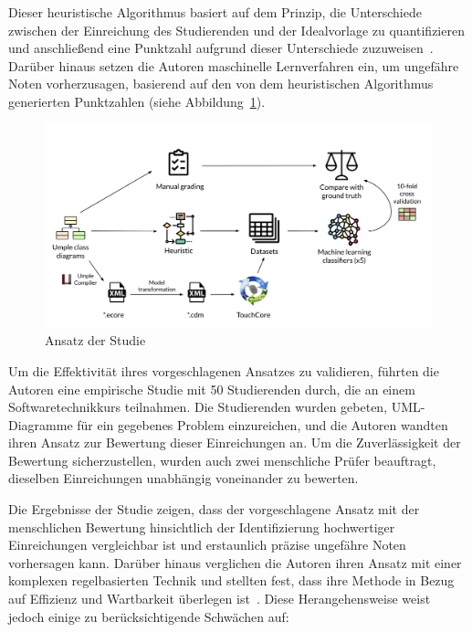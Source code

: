 Dieser heuristische Algorithmus basiert auf dem Prinzip, die Unterschiede zwischen der Einreichung des Studierenden und der
Idealvorlage zu quantifizieren und anschließend eine Punktzahl aufgrund dieser Unterschiede zuzuweisen~\cite{huyck1993efficient}.
Darüber hinaus setzen die Autoren maschinelle Lernverfahren ein, um ungefähre Noten vorherzusagen, basierend auf den von
dem heuristischen Algorithmus generierten Punktzahlen (siehe Abbildung~\ref{fig:ml-approach}).

\begin{figure}
	\centering
	\includegraphics[width=14cm]{images/ml-approach}
	\caption{Ansatz der Studie \cite{boubekeur2020automatic}}
	\label{fig:ml-approach}
\end{figure}

Um die Effektivität ihres vorgeschlagenen Ansatzes zu validieren, führten die Autoren eine empirische Studie mit 50
Studierenden durch, die an einem Softwaretechnikkurs teilnahmen. Die Studierenden wurden gebeten, UML-Diagramme für ein
gegebenes Problem einzureichen, und die Autoren wandten ihren Ansatz zur Bewertung dieser Einreichungen an.
Um die Zuverlässigkeit der Bewertung sicherzustellen, wurden auch zwei menschliche Prüfer beauftragt, dieselben
Einreichungen unabhängig voneinander zu bewerten.

Die Ergebnisse der Studie zeigen, dass der vorgeschlagene Ansatz mit der menschlichen Bewertung hinsichtlich der
Identifizierung hochwertiger Einreichungen vergleichbar ist und erstaunlich präzise ungefähre Noten vorhersagen kann.
Darüber hinaus verglichen die Autoren ihren Ansatz mit einer komplexen regelbasierten Technik und stellten fest, dass
ihre Methode in Bezug auf Effizienz und Wartbarkeit überlegen ist~\cite{boubekeur2020automatic}. Diese Herangehensweise
weist jedoch einige zu berücksichtigende Schwächen auf:

